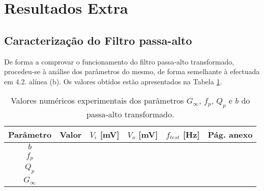 
\section{Resultados Extra}

\subsection{Caracterização do Filtro passa-alto}

De forma a comprovar o funcionamento do filtro passa-alto transformado, procedeu-se à análise dos parâmetros do mesmo, de forma semelhante à efectuada em 4.2. alínea (b). Os valores obtidos estão apresentados na Tabela \ref{tab:param_exp_hp}.

\begin{table}[!ht]
\centering
\begin{tabular}{|c|c|c|c|c|c|}
\hline
{Parâmetro} &{ Valor} & $V_i$ [mV] & $V_o$ [mV] & $f_{test}$ [Hz] & Pág. anexo \\
\hline\hline
$b$ & \quad\quad\quad\quad\quad\quad\quad & \quad\quad\quad\quad\quad\quad\quad &
	\quad\quad\quad\quad\quad\quad\quad & \quad\quad\quad\quad\quad\quad\quad & \\
\hline
$f_p$ &&&&& \\
\hline
$Q_p$ &&&&& \\
\hline
$G_\infty$ &&&&& \\
\hline
\end{tabular}
\caption{Valores numéricos experimentais dos parâmetros $G_\infty$, $f_p$, $Q_p$ e $b$ do passa-alto transformado.}
\label{tab:param_exp_hp}
\end{table}

